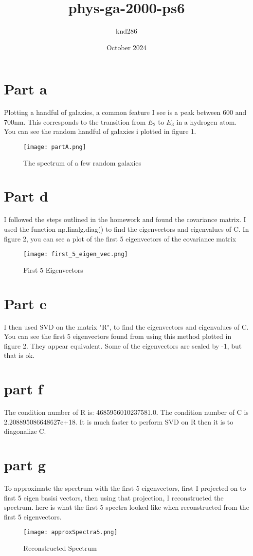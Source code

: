 \documentclass{article}
\title{phys-ga-2000-ps6}
\author{knd286 }
\date{October 2024}
\begin{document}
\maketitle

\section{Part a}
Plotting a handful of galaxies, a common feature I see is a peak between 600 and 700nm. This  corresponds to the transition from $E_2$ to $E_3$ in a hydrogen atom. You can see the random handful of galaxies i plotted in figure 1.
\begin{figure}[h!]
    \centering
    \texttt{[image: partA.png]}
    \caption{The spectrum of a few random galaxies}
    \label{The flux of a few random galaxies}
\end{figure}
\section{Part d}
I followed the steps outlined in the homework and found the covariance matrix. I used the function np.linalg.diag() to find the eigenvectors and eigenvalues of C. In figure 2, you can see a plot of the first 5 eigenvectors of the covariance matrix

\begin{figure}[h!]
    \centering
    \texttt{[image: first\_5\_eigen\_vec.png]}
    \caption{First 5 Eigenvectors}
    \label{fig:enter-label}
\end{figure}

\section{Part e}
I then used SVD on the matrix "R", to find the eigenvectors and eigenvalues of C. You can see the first 5 eigenvectors found from using this method plotted in figure 2. They appear equivalent. Some of the eigenvectors are scaled by -1, but that is ok.
\par


\section{part f}
The condition number of R  is: 4685956010237581.0. The condition number of C is 2.208895086648627e+18. It is much faster to perform SVD on R then it is to diagonalize C.

\section{part g}
To approximate the spectrum with the first 5 eigenvectors, first I projected on to first 5 eigen basisi vectors, then using that projection, I reconstructed the spectrum. here is what the first 5 spectra looked like when reconstructed from the first 5 eigenvectors. 
\begin{figure}[h!]
     \centering
     \texttt{[image: approxSpectra5.png]}
     \caption{Reconstructed Spectrum}
     \label{fig:enter-label}
 \end{figure}
\end{document}
